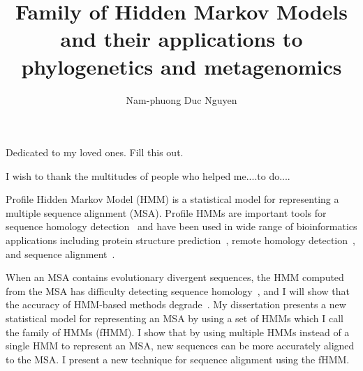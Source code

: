 \documentclass[12pt]{report}	%
\author{Nam-phuong Duc Nguyen}  	%
\title{Family of Hidden Markov Models and their applications to phylogenetics and metagenomics}
\theoremstyle{definition}
\theoremstyle{remark}
\begin{document}
\sloppy
\copyrightpage          %


%
%
%
\commcertpage           %

\titlepage              %



%
\begin{dedication}
%
Dedicated to my loved ones.  Fill this out.
\end{dedication}


\begin{acknowledgments}%
%
I wish to thank the multitudes of people who helped me....to do....
\end{acknowledgments}



\utabstract
{}%
\indent

Profile Hidden Markov Model (HMM) is a statistical model for representing a multiple sequence alignment (MSA).  Profile HMMs are important tools for sequence homology detection~\cite{Eddy1998} and have been used in wide range of bioinformatics applications including protein structure prediction~\cite{Karplus2009,Soding2005,Chen2005}, remote homology detection~\cite{Soding2005}, and sequence alignment~\cite{hmmer}.  

When an MSA contains evolutionary divergent sequences, the HMM computed from the MSA has difficulty detecting sequence homology~\cite{Moriyama2006,Finn2010}, and I will show that the accuracy of HMM-based methods degrade~\cite{Mirarab2012}.  My dissertation presents a new statistical model for representing an MSA by using a set of HMMs which I call the family of HMMs (fHMM).  I show that by using multiple HMMs instead of a single HMM to represent an MSA, new sequences can be more accurately aligned to the MSA.  I present a new technique for sequence alignment using the fHMM.
\end{document}
